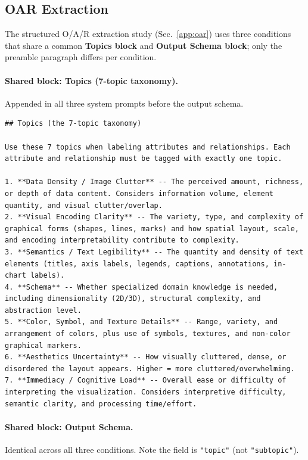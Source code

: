 \subsection{OAR Extraction}
\label{app:prompts-oar}

The structured O/A/R extraction study (Sec.~\ref{app:oar}) uses three
conditions that share a common \textbf{Topics block} and
\textbf{Output Schema block}; only the preamble paragraph differs per
condition.

\paragraph{Shared block: Topics (7-topic taxonomy).}
Appended in all three system prompts before the output schema.

\begin{lstlisting}
## Topics (the 7-topic taxonomy)

Use these 7 topics when labeling attributes and relationships. Each attribute and relationship must be tagged with exactly one topic.

1. **Data Density / Image Clutter** -- The perceived amount, richness, or depth of data content. Considers information volume, element quantity, and visual clutter/overlap.
2. **Visual Encoding Clarity** -- The variety, type, and complexity of graphical forms (shapes, lines, marks) and how spatial layout, scale, and encoding interpretability contribute to complexity.
3. **Semantics / Text Legibility** -- The quantity and density of text elements (titles, axis labels, legends, captions, annotations, in-chart labels).
4. **Schema** -- Whether specialized domain knowledge is needed, including dimensionality (2D/3D), structural complexity, and abstraction level.
5. **Color, Symbol, and Texture Details** -- Range, variety, and arrangement of colors, plus use of symbols, textures, and non-color graphical markers.
6. **Aesthetics Uncertainty** -- How visually cluttered, dense, or disordered the layout appears. Higher = more cluttered/overwhelming.
7. **Immediacy / Cognitive Load** -- Overall ease or difficulty of interpreting the visualization. Considers interpretive difficulty, semantic clarity, and processing time/effort.
\end{lstlisting}

\paragraph{Shared block: Output Schema.}
Identical across all three conditions. Note the field is \texttt{"topic"}
(not \texttt{"subtopic"}).

